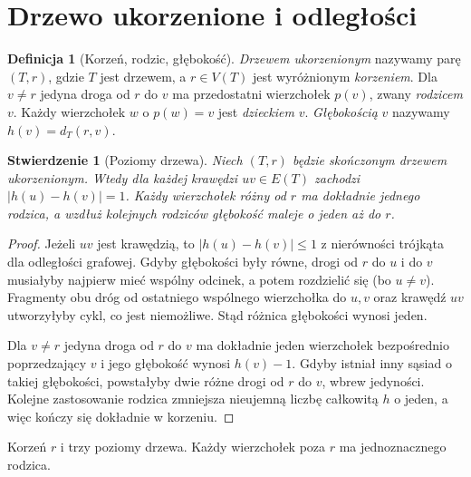 \documentclass[11pt,a4paper]{report}
\numberwithin{equation}{section}
\theoremstyle{plain}
\newtheorem{stwierdzenie}[twierdzenie]{Stwierdzenie}
\theoremstyle{definition}
\newtheorem{definicja}[twierdzenie]{Definicja}
\theoremstyle{remark}
\begin{document}
\section{Drzewo ukorzenione i odległości}
\label{sec:tg-ukorzenione}

\begin{definicja}[Korzeń, rodzic, głębokość]
\emph{Drzewem ukorzenionym} nazywamy parę
$(T,r)$, gdzie $T$ jest drzewem, a
$r\in V(T)$ jest wyróżnionym
\emph{korzeniem}. Dla $v\ne r$ jedyna droga
od $r$ do $v$ ma przedostatni wierzchołek
$p(v)$, zwany \emph{rodzicem} $v$. Każdy
wierzchołek $w$ o $p(w)=v$ jest \emph{dzieckiem}
$v$. \emph{Głębokością} $v$ nazywamy
$h(v)=d_T(r,v)$.
\end{definicja}

\begin{stwierdzenie}[Poziomy drzewa]
Niech $(T,r)$ będzie skończonym drzewem
ukorzenionym. Wtedy dla każdej krawędzi
$uv\in E(T)$ zachodzi $|h(u)-h(v)|=1$.
Każdy wierzchołek różny od $r$ ma dokładnie
jednego rodzica, a wzdłuż kolejnych rodziców
głębokość maleje o jeden aż do $r$.
\end{stwierdzenie}

\begin{proof}
Jeżeli $uv$ jest krawędzią, to
$|h(u)-h(v)|\le1$ z nierówności trójkąta
dla odległości grafowej. Gdyby głębokości
były równe, drogi od $r$ do $u$ i do $v$
musiałyby najpierw mieć wspólny odcinek,
a potem rozdzielić się (bo $u\ne v$).
Fragmenty obu dróg od ostatniego wspólnego
wierzchołka do $u,v$ oraz krawędź $uv$
utworzyłyby cykl, co jest niemożliwe.
Stąd różnica głębokości wynosi jeden.

Dla $v\ne r$ jedyna droga od $r$ do $v$
ma dokładnie jeden wierzchołek bezpośrednio
poprzedzający $v$ i jego głębokość wynosi
$h(v)-1$. Gdyby istniał inny sąsiad o
takiej głębokości, powstałyby dwie różne
drogi od $r$ do $v$, wbrew jedyności.
Kolejne zastosowanie rodzica zmniejsza
nieujemną liczbę całkowitą $h$ o jeden,
a więc kończy się dokładnie w korzeniu.
\end{proof}

\begin{center}

{\footnotesize Korzeń $r$ i trzy poziomy drzewa.
Każdy wierzchołek poza $r$ ma jednoznacznego rodzica.}
\end{center}
\end{document}

